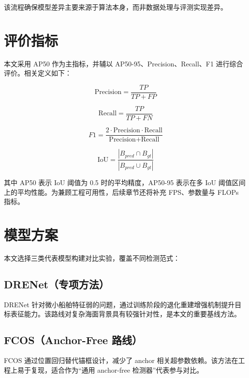 该流程确保模型差异主要来源于算法本身，而非数据处理与评测实现差异。

\section{评价指标}

本文采用 AP50 作为主指标，并辅以 AP50-95、Precision、Recall、F1 进行综合评价。相关定义如下：

\begin{equation}
\text{Precision} = \frac{TP}{TP + FP}
\end{equation}

\begin{equation}
\text{Recall} = \frac{TP}{TP + FN}
\end{equation}

\begin{equation}
F1 = \frac{2 \cdot \text{Precision} \cdot \text{Recall}}{\text{Precision} + \text{Recall}}
\end{equation}

\begin{equation}
\text{IoU} = \frac{|B_{pred} \cap B_{gt}|}{|B_{pred} \cup B_{gt}|}
\end{equation}

其中 AP50 表示 IoU 阈值为 0.5 时的平均精度，AP50-95 表示在多 IoU 阈值区间上的平均性能。为兼顾工程可用性，后续章节还将补充 FPS、参数量与 FLOPs 指标。

\section{模型方案}

本文选择三类代表模型构建对比实验，覆盖不同检测范式：

\subsection{DRENet（专项方法）}

DRENet 针对微小船舶特征弱的问题，通过训练阶段的退化重建增强机制提升目标表征能力\cite{chen2022_tinyship_drenet}。该路线对复杂海面背景具有较强针对性，是本文的重要基线方法。

\subsection{FCOS（Anchor-Free 路线）}

FCOS 通过位置回归替代锚框设计，减少了 anchor 相关超参数依赖\cite{tian2019_fcos}。该方法在工程上易于复现，适合作为“通用 anchor-free 检测器”代表参与对比。

